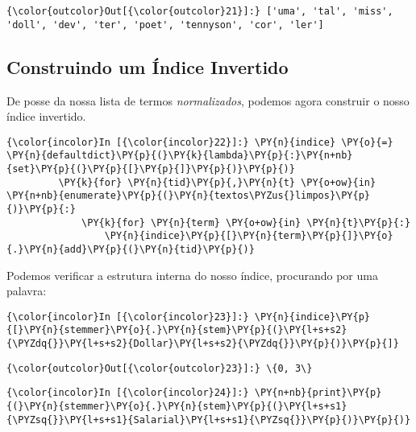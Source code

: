             \begin{Verbatim}[commandchars=\\\{\}]
{\color{outcolor}Out[{\color{outcolor}21}]:} ['uma', 'tal', 'miss', 'doll', 'dev', 'ter', 'poet', 'tennyson', 'cor', 'ler']
\end{Verbatim}
        
    \subsection{Construindo um Índice
Invertido}\label{construindo-um-uxedndice-invertido}

De posse da nossa lista de termos \emph{normalizados}, podemos agora
construir o nosso índice invertido.

    \begin{Verbatim}[commandchars=\\\{\}]
{\color{incolor}In [{\color{incolor}22}]:} \PY{n}{indice} \PY{o}{=} \PY{n}{defaultdict}\PY{p}{(}\PY{k}{lambda}\PY{p}{:}\PY{n+nb}{set}\PY{p}{(}\PY{p}{[}\PY{p}{]}\PY{p}{)}\PY{p}{)}
         \PY{k}{for} \PY{n}{tid}\PY{p}{,}\PY{n}{t} \PY{o+ow}{in} \PY{n+nb}{enumerate}\PY{p}{(}\PY{n}{textos\PYZus{}limpos}\PY{p}{)}\PY{p}{:}
             \PY{k}{for} \PY{n}{term} \PY{o+ow}{in} \PY{n}{t}\PY{p}{:}
                 \PY{n}{indice}\PY{p}{[}\PY{n}{term}\PY{p}{]}\PY{o}{.}\PY{n}{add}\PY{p}{(}\PY{n}{tid}\PY{p}{)}
\end{Verbatim}

    Podemos verificar a estrutura interna do nosso índice, procurando por
uma palavra:

    \begin{Verbatim}[commandchars=\\\{\}]
{\color{incolor}In [{\color{incolor}23}]:} \PY{n}{indice}\PY{p}{[}\PY{n}{stemmer}\PY{o}{.}\PY{n}{stem}\PY{p}{(}\PY{l+s+s2}{\PYZdq{}}\PY{l+s+s2}{Dollar}\PY{l+s+s2}{\PYZdq{}}\PY{p}{)}\PY{p}{]}
\end{Verbatim}

            \begin{Verbatim}[commandchars=\\\{\}]
{\color{outcolor}Out[{\color{outcolor}23}]:} \{0, 3\}
\end{Verbatim}
        
    \begin{Verbatim}[commandchars=\\\{\}]
{\color{incolor}In [{\color{incolor}24}]:} \PY{n+nb}{print}\PY{p}{(}\PY{n}{stemmer}\PY{o}{.}\PY{n}{stem}\PY{p}{(}\PY{l+s+s1}{\PYZsq{}}\PY{l+s+s1}{Salarial}\PY{l+s+s1}{\PYZsq{}}\PY{p}{)}\PY{p}{)}
\end{Verbatim}

